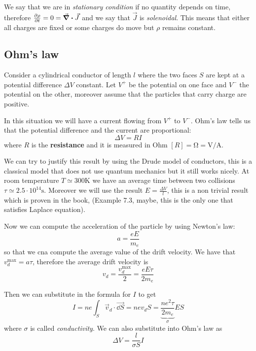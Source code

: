 \documentclass[12pt]{extarticle}
\begin{document}
We say that we are in \emph{stationary condition} if no quantity depends on time,
therefore $\pdv{\rho}{t} = 0 = \div \vec J$ and we say that $\vec J$ is \emph{solenoidal}.
This means that either all charges are fixed or some charges do move but $\rho$ remains constant.

\subsection{Ohm's law}

Consider a cylindrical conductor of length $l$
where the two faces $S$ are kept at a potential difference $\Delta V$ constant.
Let $V^+$ be the potential on one face and $V^-$ the potential on the other,
moreover assume that the particles that carry charge are positive.

In this situation we will have a current flowing from $V^+$ to $V^-$.
Ohm's law tells us that the potential difference and the current are proportional:
\begin{equation}
    \Delta V = R I
\end{equation}
where $R$ is the \textbf{resistance} and it is measured in Ohm $[R] = \si{\ohm} = \si{\volt \per \ampere}$.

We can try to justify this result by using the Drude model of conductors,
this is a classical model that does not use quantum mechanics but it still works nicely.
At room temperature $T \simeq 300 \si{\kelvin}$
we have an average time between two collisions $\tau \simeq 2.5 \cdot 10^14 \si{\second}$.
Moreover we will use the result $E = \frac{\Delta V}{l}$, this is a non trivial result which is proven in the book,
(Example 7.3, maybe, this is the only one that satisfies Laplace equation).

Now we can compute the acceleration of the particle by using Newton's law:
\begin{equation}
    a = \frac{e E}{m_e}
\end{equation}
so that we cna compute the average value of the drift velocity.
We have that $v_d^{\text{max}} = a \tau$, therefore the average drift velocity is
\begin{equation}
    v_d = \frac{v_d^{\text{max}}}{2} = \frac{e E \tau}{2 m_e}
\end{equation}

Then we can substitute in the formula for $I$ to get
\begin{equation}
    I = n e \int_S \vec v_d \cdot \vec{\dd S} = n e v_d S = \underbrace{\frac{n e^2 \tau}{2 m_e}}_\sigma E S
\end{equation}
where $\sigma$ is called \emph{conductivity}.
We can also substitute into Ohm's law as
\begin{equation}
    \Delta V = \frac{l}{\sigma S} I
\end{equation}
\end{document}
